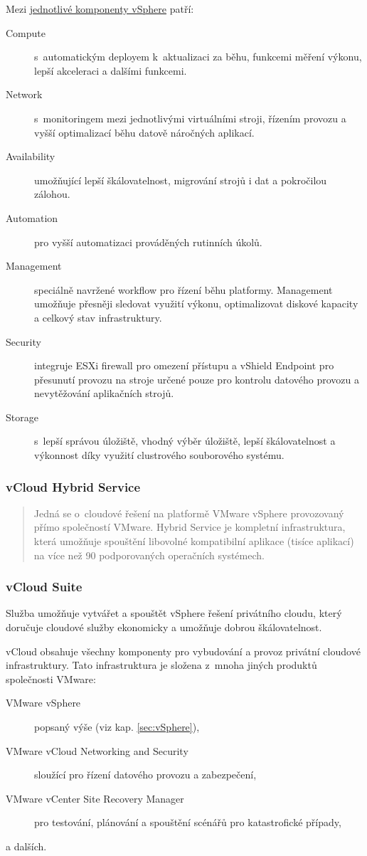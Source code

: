 Mezi \href{http://www.vmware.com/products/vsphere/features.html}{jednotlivé komponenty vSphere} patří:
\begin{description}
	\item[Compute] s~automatickým deployem k~aktualizaci za běhu, funkcemi měření výkonu, lepší akceleraci a dalšími funkcemi.
	\item[Network] s~monitoringem mezi jednotlivými virtuálními stroji, řízením provozu a vyšší optimalizací běhu datově náročných aplikací.
	\item[Availability] umožňující lepší škálovatelnost, migrování strojů i dat a pokročilou zálohou.
	\item[Automation] pro vyšší automatizaci prováděných rutinních úkolů.
	\item[Management] speciálně navržené workflow pro řízení běhu platformy. Management umožňuje přesněji sledovat využití výkonu, optimalizovat diskové kapacity a celkový stav infrastruktury.
	\item[Security] integruje ESXi firewall pro omezení přístupu a vShield Endpoint pro přesunutí provozu na stroje určené pouze pro kontrolu datového provozu a nevytěžování aplikačních strojů.
	\item[Storage] s~lepší správou úložiště, vhodný výběr úložiště, lepší škálovatelnost a výkonnost díky využití clustrového souborového systému.
\end{description}

\subsubsection{vCloud Hybrid Service}
\begin{quote}
Jedná se o~cloudové řešení na platformě VMware vSphere provozovaný přímo společností VMware. Hybrid Service je kompletní infrastruktura, která umožňuje spouštění libovolné kompatibilní aplikace (tisíce aplikací) na více než 90 podporovaných operačních systémech.\cite{vmware:hybridService}
\end{quote}

\subsubsection{vCloud Suite}
Služba umožňuje vytvářet a spouštět vSphere řešení privátního cloudu, který doručuje cloudové služby ekonomicky a umožňuje dobrou škálovatelnost.\cite{vmware:vCloudDatasheet}

vCloud obsahuje všechny komponenty pro vybudování a provoz privátní cloudové infrastruktury. Tato infrastruktura je složena z~mnoha jiných produktů společnosti VMware:
\begin{description}
	\item[VMware vSphere] popsaný výše (viz kap. \ref{sec:vSphere}),
	\item[VMware vCloud Networking and Security] sloužící pro řízení datového provozu a zabezpečení,
	\item[VMware vCenter Site Recovery Manager] pro testování, plánování a spouštění scénářů pro katastrofické případy,
	\item[a dalších.]
\end{description}

